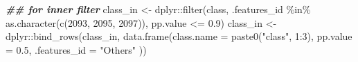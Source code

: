 \documentclass[
]{article}
\newenvironment{Shaded}{\begin{snugshade}}{\end{snugshade}}
\newcommand{\AttributeTok}[1]{\textcolor[rgb]{0.77,0.63,0.00}{#1}}
\newcommand{\DecValTok}[1]{\textcolor[rgb]{0.00,0.00,0.81}{#1}}
\newcommand{\DocumentationTok}[1]{\textcolor[rgb]{0.56,0.35,0.01}{\textbf{\textit{#1}}}}
\newcommand{\FloatTok}[1]{\textcolor[rgb]{0.00,0.00,0.81}{#1}}
\newcommand{\FunctionTok}[1]{\textcolor[rgb]{0.00,0.00,0.00}{#1}}
\newcommand{\NormalTok}[1]{#1}
\newcommand{\OtherTok}[1]{\textcolor[rgb]{0.56,0.35,0.01}{#1}}
\newcommand{\SpecialCharTok}[1]{\textcolor[rgb]{0.00,0.00,0.00}{#1}}
\newcommand{\StringTok}[1]{\textcolor[rgb]{0.31,0.60,0.02}{#1}}
\begin{document}
\begin{Shaded}
\begin{Highlighting}[]
\DocumentationTok{\#\# for inner filter}
\NormalTok{class\_in }\OtherTok{\textless{}{-}}\NormalTok{ dplyr}\SpecialCharTok{::}\FunctionTok{filter}\NormalTok{(class, .features\_id }\SpecialCharTok{\%in\%} \FunctionTok{as.character}\NormalTok{(}\FunctionTok{c}\NormalTok{(}\DecValTok{2093}\NormalTok{, }\DecValTok{2095}\NormalTok{, }\DecValTok{2097}\NormalTok{)),}
\NormalTok{  pp.value }\SpecialCharTok{\textless{}=} \FloatTok{0.9}\NormalTok{)}
\NormalTok{class\_in }\OtherTok{\textless{}{-}}\NormalTok{ dplyr}\SpecialCharTok{::}\FunctionTok{bind\_rows}\NormalTok{(class\_in,}
  \FunctionTok{data.frame}\NormalTok{(}\AttributeTok{class.name =} \FunctionTok{paste0}\NormalTok{(}\StringTok{"class"}\NormalTok{, }\DecValTok{1}\SpecialCharTok{:}\DecValTok{3}\NormalTok{),}
    \AttributeTok{pp.value =} \FloatTok{0.5}\NormalTok{,}
    \AttributeTok{.features\_id =} \StringTok{"Others"}
\NormalTok{    ))}


\end{Highlighting}
\end{Shaded}
\end{document}
